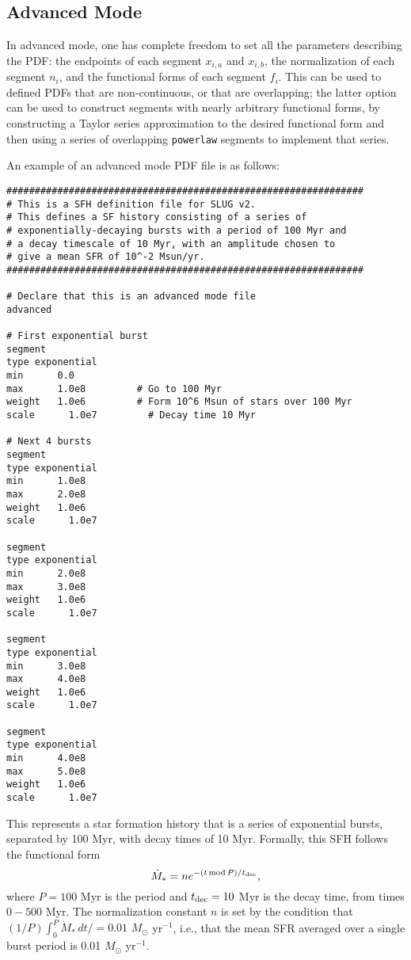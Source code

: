 \documentclass[12pt]{article}
\begin{document}
\subsection{Advanced Mode}

In advanced mode, one has complete freedom to set all the parameters describing the PDF: the endpoints of each segment $x_{i,a}$ and $x_{i,b}$, the normalization of each segment $n_i$, and the functional forms of each segment $f_i$. This can be used to defined PDFs that are non-continuous, or that are overlapping; the latter option can be used to construct segments with nearly arbitrary functional forms, by constructing a Taylor series approximation to the desired functional form and then using a series of overlapping \verb=powerlaw= segments to implement that series.

An example of an advanced mode PDF file is as follows:
\begin{verbatim}
###############################################################
# This is a SFH definition file for SLUG v2.
# This defines a SF history consisting of a series of
# exponentially-decaying bursts with a period of 100 Myr and
# a decay timescale of 10 Myr, with an amplitude chosen to
# give a mean SFR of 10^-2 Msun/yr.
###############################################################

# Declare that this is an advanced mode file
advanced

# First exponential burst
segment
type exponential
min      0.0
max      1.0e8         # Go to 100 Myr
weight   1.0e6         # Form 10^6 Msun of stars over 100 Myr
scale	   1.0e7         # Decay time 10 Myr

# Next 4 bursts
segment
type exponential
min      1.0e8
max      2.0e8
weight   1.0e6
scale	   1.0e7

segment
type exponential
min      2.0e8
max      3.0e8
weight   1.0e6
scale	   1.0e7

segment
type exponential
min      3.0e8
max      4.0e8
weight   1.0e6
scale	   1.0e7

segment
type exponential
min      4.0e8
max      5.0e8
weight   1.0e6
scale	   1.0e7
\end{verbatim}
This represents a star formation history that is a series of exponential bursts, separated by 100 Myr, with decay times of 10 Myr. Formally, this SFH follows the functional form
\begin{equation}
\dot{M}_* = n e^{-(t\,\mathrm{mod}\, P)/t_{\rm dec}},
\end{equation}
where $P = 100$ Myr is the period and $t_{\rm dec} = 10$ Myr is the decay time, from times $0-500$ Myr. The normalization constant $n$ is set by the condition that $(1/P) \int_0^P \dot{M}_* \,dt / = 0.01$ $M_\odot$ yr$^{-1}$, i.e., that the mean SFR averaged over a single burst period is 0.01 $M_\odot$ yr$^{-1}$.
\end{document}
